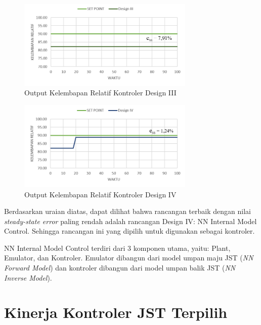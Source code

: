 \begin{figure}[!h]
	\centering
	\includegraphics[width=0.75\textwidth]{figures/ControlComparisonRH3}
	\caption{Output Kelembapan Relatif Kontroler Design III}
	\label{fig:5:ControlComparisonRH3}
\end{figure}
\vspace{1em}

\begin{figure}[!h]
	\centering
	\includegraphics[width=0.75\textwidth]{figures/ControlComparisonRH4}
	\caption{Output Kelembapan Relatif Kontroler Design IV}
	\label{fig:5:ControlComparisonRH4}
\end{figure}
\vspace{1em}

Berdasarkan uraian diatas, dapat dilihat bahwa rancangan terbaik dengan nilai \textit{steady-state error} paling rendah adalah rancangan Design IV: NN Internal Model Control. Sehingga rancangan ini yang dipilih untuk digunakan sebagai kontroler. 

NN Internal Model Control terdiri dari 3 komponen utama, yaitu: Plant, Emulator, dan Kontroler. Emulator dibangun dari model umpan maju JST (\textit{NN Forward Model}) dan kontroler dibangun dari model umpan balik JST (\textit{NN Inverse Model}).\\

\section{Kinerja Kontroler JST Terpilih}

